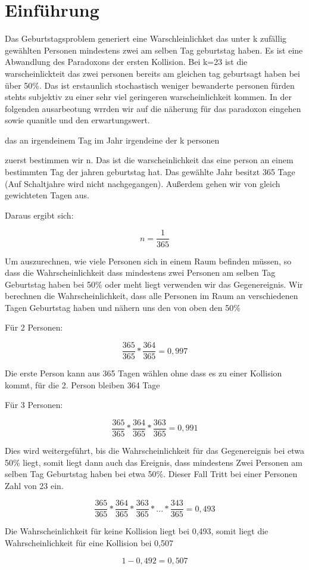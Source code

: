 \documentclass[../main.tex]{subfiles}
\begin{document}
\section{Einführung}

Das Geburtstagsproblem generiert eine Warschleinlichket das unter k zufällig gewählten Personen mindestens zwei am selben Tag geburtstag haben. Es ist eine Abwandlung des Paradoxons der ersten Kollision. \cite{henze} Bei k=23 ist die warscheinlickteit das zwei personen bereits am gleichen tag geburtsagt haben bei über 50\%. Das ist erstaunlich stochastisch weniger bewanderte personen
fürden stehts subjektiv zu einer sehr viel geringeren warscheinlichkeit kommen. In der folgenden ausarbeotung wrrden wir auf die näherung für das paradoxon eingehen sowie quanitle und den erwartungswert.

das an irgendeinem Tag im Jahr irgendeine der k personen

zuerst bestimmen wir n. Das ist die warscheinlichkeit das eine person an einem bestimmten Tag der jahren geburtstag hat. Das gewählte Jahr besitzt 365 Tage (Auf Schaltjahre wird nicht nachgegangen). Außerdem gehen wir von gleich gewichteten Tagen aus.

Daraus ergibt sich:

\begin{equation}
n = \frac{1}{365}
\end{equation}

Um auszurechnen, wie viele Personen sich in einem Raum befinden müssen, so dass die Wahrscheinlichkeit dass mindestens zwei Personen am selben Tag Geburtstag haben bei 50\% oder meht liegt verwenden wir das Gegenereignis. Wir berechnen die Wahrscheinlichkeit, dass alle Personen im Raum an verschiedenen Tagen Geburtstag haben und nähern uns den von oben den 50\%

Für 2 Personen:

\begin{equation}
 \frac{365}{365} * \frac{364}{365} = 0,997
\end{equation}

Die erste Person kann aus 365 Tagen wählen ohne dass es zu einer Kollision kommt, für die 2. Person bleiben 364 Tage

Für 3 Personen:

\begin{equation}
 \frac{365}{365} * \frac{364}{365} * \frac{363}{365} = 0,991
\end{equation}

Dies wird weitergeführt, bis die Wahrscheinlichkeit für das Gegenereignis bei etwa 50\% liegt, somit liegt dann auch das Ereignis, dass mindestens Zwei Personen am selben Tag Geburtstag haben bei etwa 50\%. Dieser Fall Tritt bei einer Personen Zahl von 23 ein.

\begin{equation}
 \frac{365}{365} * \frac{364}{365} * \frac{363}{365} * ... * \frac{343}{365} = 0,493
\end{equation}

Die Wahrscheinlichkeit für keine Kollision liegt bei 0,493, somit liegt die Wahrscheinlichkeit für eine Kollision bei 0,507

\begin{equation}
 1-0,492 = 0,507
\end{equation}
\end{document}
